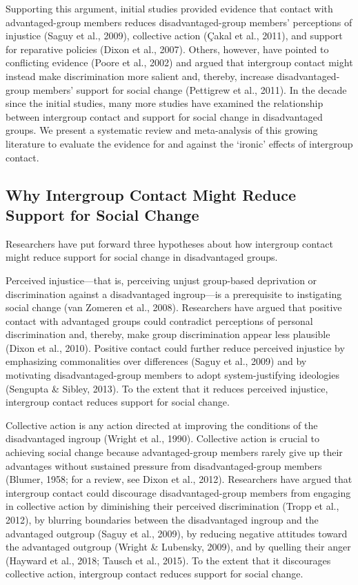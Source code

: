 \documentclass[12pt, letterpaper]{article}
\begin{document}
Supporting this argument, initial studies provided evidence that contact
with advantaged-group members reduces disadvantaged-group members'
perceptions of injustice (Saguy et al., 2009), collective action (Çakal
et al., 2011), and support for reparative policies (Dixon et al., 2007).
Others, however, have pointed to conflicting evidence (Poore et al.,
2002) and argued that intergroup contact might instead make
discrimination more salient and, thereby, increase disadvantaged-group
members' support for social change (Pettigrew et al., 2011). In the
decade since the initial studies, many more studies have examined the
relationship between intergroup contact and support for social change in
disadvantaged groups. We present a systematic review and meta-analysis
of this growing literature to evaluate the evidence for and against the
`ironic' effects of intergroup contact.

\hypertarget{why-intergroup-contact-might-reduce-support-for-social-change}{%
\subsection{Why Intergroup Contact Might Reduce Support for Social
Change}\label{why-intergroup-contact-might-reduce-support-for-social-change}}

Researchers have put forward three hypotheses about how intergroup
contact might reduce support for social change in disadvantaged groups.

Perceived injustice---that is, perceiving unjust group-based deprivation
or discrimination against a disadvantaged ingroup---is a prerequisite to
instigating social change (van Zomeren et al., 2008). Researchers have
argued that positive contact with advantaged groups could contradict
perceptions of personal discrimination and, thereby, make group
discrimination appear less plausible (Dixon et al., 2010). Positive
contact could further reduce perceived injustice by emphasizing
commonalities over differences (Saguy et al., 2009) and by motivating
disadvantaged-group members to adopt system-justifying ideologies
(Sengupta \& Sibley, 2013). To the extent that it reduces perceived
injustice, intergroup contact reduces support for social change.

Collective action is any action directed at improving the conditions of
the disadvantaged ingroup (Wright et al., 1990). Collective action is
crucial to achieving social change because advantaged-group members
rarely give up their advantages without sustained pressure from
disadvantaged-group members (Blumer, 1958; for a review, see Dixon et
al., 2012). Researchers have argued that intergroup contact could
discourage disadvantaged-group members from engaging in collective
action by diminishing their perceived discrimination (Tropp et al.,
2012), by blurring boundaries between the disadvantaged ingroup and the
advantaged outgroup (Saguy et al., 2009), by reducing negative attitudes
toward the advantaged outgroup (Wright \& Lubensky, 2009), and by
quelling their anger (Hayward et al., 2018; Tausch et al., 2015). To the
extent that it discourages collective action, intergroup contact reduces
support for social change.
\end{document}
